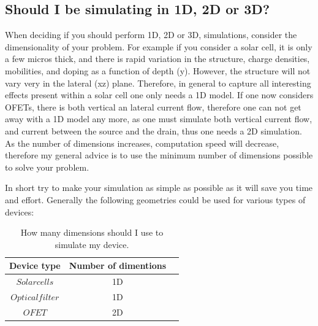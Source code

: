 \subsection{Should I be simulating in 1D, 2D or 3D?}
When deciding if you should perform 1D, 2D or 3D, simulations, consider the dimensionality of your problem.  For example if you consider a solar cell, it is only a few micros thick, and there is rapid variation in the structure, charge densities, mobilities, and doping as a function of depth (y).  However, the structure will not vary very in the lateral (xz) plane.  Therefore, in general  to capture all interesting effects present within a solar cell one only needs a 1D model.  If one now considers OFETs, there is both vertical an lateral current flow, therefore one can not get away with a 1D model any more, as one must simulate both vertical current flow, and current between the source and the drain, thus one needs a 2D simulation.  As the number of dimensions increases, computation speed will decrease, therefore my general advice is to use the minimum number of dimensions possible to solve your problem.

In short try to make your simulation as simple as possible as it will save you time and effort.  Generally the following geometries could be used for various types of devices:

\begin{table}[H]
\begin{center}
\begin{tabular}{ |c|c|c| } 
 \hline
	Device type			& 	Number of dimentions  \\ 
 \hline
	$Solar cells$ 		&	1D \\ 
	$Optical filter$	&	1D\\ 
	$OFET$ 				&	2D\\ 
 \hline
\end{tabular}
\caption{How many dimensions should I use to simulate my device.}
\end{center}
\end{table}

